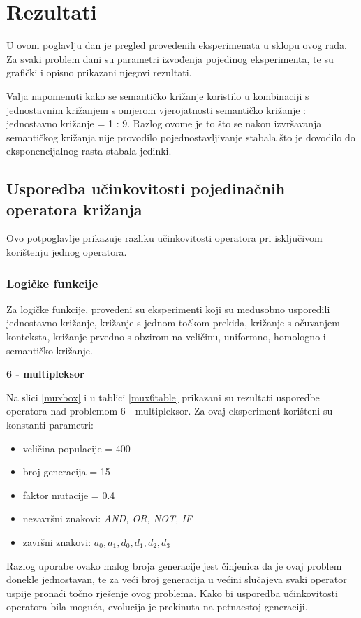 \section{Rezultati}

U ovom poglavlju dan je pregled provedenih eksperimenata u sklopu ovog rada. Za svaki problem dani su parametri izvođenja pojedinog eksperimenta, te su grafički i opisno prikazani njegovi rezultati.

Valja napomenuti kako se semantičko križanje koristilo u kombinaciji s jednostavnim križanjem s omjerom vjerojatnosti semantičko križanje : jednostavno križanje = 1 : 9. Razlog ovome je to što se nakon izvršavanja semantičkog križanja nije provodilo pojednostavljivanje stabala što je dovodilo do eksponencijalnog rasta stabala jedinki.

\subsection{Usporedba učinkovitosti pojedinačnih operatora križanja}

Ovo potpoglavlje prikazuje razliku učinkovitosti operatora pri isključivom korištenju jednog operatora.

\subsubsection{Logičke funkcije}

Za logičke funkcije, provedeni su eksperimenti koji su međusobno usporedili jednostavno križanje, križanje s jednom točkom prekida, križanje s očuvanjem konteksta, križanje prvedno s obzirom na veličinu, uniformno, homologno i semantičko križanje.

\textbf{6 - multipleksor}

Na slici \ref{muxbox} i u tablici \ref{mux6table} prikazani su rezultati usporedbe operatora nad problemom 6 - multipleksor. Za ovaj eksperiment korišteni su konstanti parametri:
\begin{itemize}
\item{veličina populacije = 400}
\item{broj generacija = 15}
\item{faktor mutacije = 0.4}
\item{nezavršni znakovi: \textit{AND, OR, NOT, IF}}
\item{završni znakovi: \textit{$a_0, a_1, d_0, d_1, d_2, d_3$}}
\end{itemize}


Razlog uporabe ovako malog broja generacije jest činjenica da je ovaj problem donekle jednostavan, te za veći broj generacija u većini slučajeva svaki operator uspije pronaći točno rješenje ovog problema. Kako bi usporedba učinkovitosti operatora bila moguća, evolucija je prekinuta na petnaestoj generaciji.

